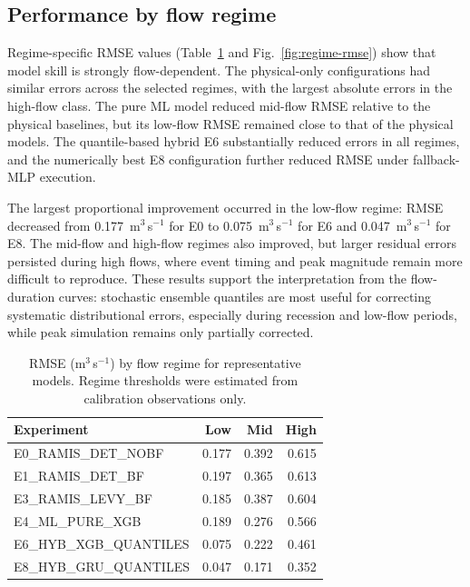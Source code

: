 \subsection{Performance by flow regime}\label{subsec:regime-results}

Regime-specific RMSE values (Table~\ref{tab:regime-rmse} and
Fig.~\ref{fig:regime-rmse}) show that model skill is strongly
flow-dependent. The physical-only configurations had similar errors
across the selected regimes, with the largest absolute errors in the
high-flow class. The pure ML model reduced mid-flow RMSE relative to
the physical baselines, but its low-flow RMSE remained close to that of
the physical models. The quantile-based hybrid E6 substantially reduced
errors in all regimes, and the numerically best E8 configuration
further reduced RMSE under fallback-MLP execution.

The largest proportional improvement occurred in the low-flow regime:
RMSE decreased from 0.177~m$^3$\,s$^{-1}$ for E0 to
0.075~m$^3$\,s$^{-1}$ for E6 and 0.047~m$^3$\,s$^{-1}$ for E8. The
mid-flow and high-flow regimes also improved, but larger residual
errors persisted during high flows, where event timing and peak
magnitude remain more difficult to reproduce. These results support the
interpretation from the flow-duration curves: stochastic ensemble
quantiles are most useful for correcting systematic distributional
errors, especially during recession and low-flow periods, while peak
simulation remains only partially corrected.

\begin{table}[t]
\caption{RMSE (m$^3$\,s$^{-1}$) by flow regime for representative
models. Regime thresholds were estimated from calibration observations
only.}
\label{tab:regime-rmse}
\centering
\small
\begin{tabular*}{\linewidth}{@{\extracolsep{\fill}}lrrr@{}}
\toprule
Experiment & Low & Mid & High \\
\midrule
E0\_RAMIS\_DET\_NOBF   & 0.177 & 0.392 & 0.615 \\
E1\_RAMIS\_DET\_BF     & 0.197 & 0.365 & 0.613 \\
E3\_RAMIS\_LEVY\_BF    & 0.185 & 0.387 & 0.604 \\
E4\_ML\_PURE\_XGB      & 0.189 & 0.276 & 0.566 \\
E6\_HYB\_XGB\_QUANTILES & 0.075 & 0.222 & 0.461 \\
E8\_HYB\_GRU\_QUANTILES & 0.047 & 0.171 & 0.352 \\
\bottomrule
\end{tabular*}
\end{table}

